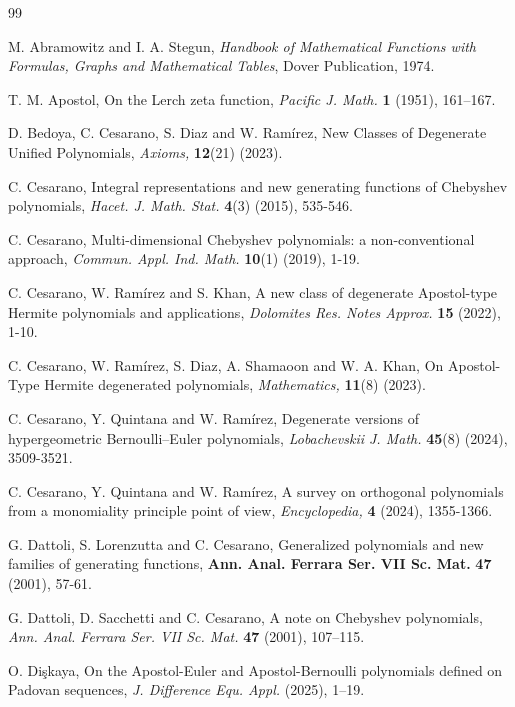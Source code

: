 \documentclass[10pt,a4paper]{amsart}
\numberwithin{equation}{section}
\begin{document}
\begin{thebibliography}{99}

M. Abramowitz and I. A. Stegun, \textit{Handbook of Mathematical Functions with Formulas, Graphs and Mathematical Tables}, Dover Publication, 1974.

T. M. Apostol, On the Lerch zeta function, \textit{Pacific J. Math.} \textbf{1} (1951), 161–167.

D. Bedoya, C. Cesarano, S. Diaz and W. Ram\'irez, New Classes of Degenerate Unified Polynomials, \textit{Axioms,} \textbf{12}(21) (2023).

C. Cesarano, Integral representations and new generating functions of Chebyshev polynomials, \textit{Hacet. J. Math. Stat.} \textbf{4}(3) (2015), 535-546.

C. Cesarano, Multi-dimensional Chebyshev polynomials: a non-conventional approach, \textit{Commun. Appl. Ind. Math.} \textbf{10}(1) (2019), 1-19.


C. Cesarano, W. Ram\'irez and S. Khan,  A new class of degenerate Apostol-type Hermite polynomials and applications, \textit{Dolomites Res. Notes Approx.} \textbf{15} (2022), 1-10.

C. Cesarano, W. Ram\'irez, S. Diaz, A. Shamaoon and W. A. Khan, On Apostol-Type Hermite degenerated polynomials, \textit{Mathematics,} \textbf{11}(8) (2023).

C. Cesarano, Y. Quintana and W. Ram\'irez, Degenerate versions of hypergeometric Bernoulli–Euler polynomials, \textit{Lobachevskii J. Math.} \textbf{45}(8) (2024), 3509-3521.

C. Cesarano, Y. Quintana and W. Ram\'irez, A survey on orthogonal polynomials from a monomiality principle point of view, \textit{Encyclopedia,} \textbf{4} (2024), 1355-1366.

G. Dattoli, S. Lorenzutta and C. Cesarano, Generalized polynomials and new families of generating functions, \textbf{Ann. Anal. Ferrara Ser. VII Sc. Mat.} \textbf{47} (2001), 57-61.


G. Dattoli, D. Sacchetti and  C. Cesarano, A note on Chebyshev polynomials, \textit{Ann. Anal. Ferrara Ser. VII Sc. Mat.} \textbf{47} (2001), 107–115.



O. Di\c{s}kaya, On the Apostol-Euler and Apostol-Bernoulli polynomials defined on Padovan sequences, \textit{J. Difference Equ. Appl.} (2025), 1–19.


\end{thebibliography}
\end{document}
